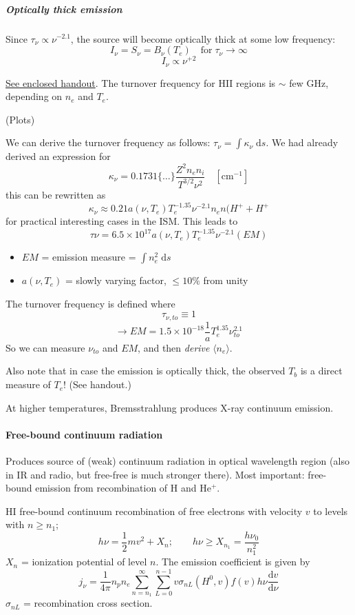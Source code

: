 \documentclass[11pt]{article}
\newcommand{\mar}[1]{\hspace{0pt}\marginpar{-\textcolor{black}{#1}-}}
\begin{document}
\subparagraph{Optically thick emission}
Since $\tau_{\nu} \propto \nu^{-2.1}$, the source will become optically
thick at some low frequency:
\[
    I_{\nu} = S_{\nu} = B_{\nu}(T_{e}) \quad
    \mathrm{for}\; \tau_{\nu} \rightarrow \infty
    \]
\[
    \boxed{ I_{\nu} \propto \nu^{+2} }
    \]

\underline{See enclosed handout}. The turnover frequency for HII regions is
$\sim$ few GHz, depending on $n_{e}$ and $T_{e}$.

\mar{66}(Plots)

\mar{67}We can derive the turnover frequency as follows:
$\tau_{\nu} = \int{\kappa_{\nu}\;\mathrm{d}s}$.
We had already derived an expression for
\[
    \kappa_{\nu} = 0.1731 \{\ldots\} \frac{Z^{2}n_{e}n_{i}}{T^{3/2}\nu^{2}}
    \quad [\mathrm{cm}^{-1}]
    \]
this can be rewritten as
\[
    \kappa_{\nu} \approx 0.21 a(\nu,T_{e}) T_{e}^{-1.35} \nu^{-2.1}
    n_{e}n(H^{+}+H^{+}
    \]
for practical interesting cases in the ISM. This leads to
\[
    \tau{\nu} = 6.5 \times 10^{17} a(\nu,T_{e}) T_{e}^{-1.35} \nu^{-2.1} (EM)
    \]
\begin{itemize}
    \item $EM$ = emission measure = $\int{ n_{e}^{2} \;\mathrm{d}s }$
    \item $a(\nu,T_{e})$ = slowly varying factor, $\leq 10\%$ from unity
\end{itemize}
The turnover frequency is defined where
\[
    \tau_{\nu,to} \equiv 1
    \]
\[
    \rightarrow EM = 1.5 \times 10^{-18} \frac{1}{a} T_{e}^{1.35} \nu_{to}^{2.1}
    \]
So we can measure $\nu_{to}$ and $EM$, and then \emph{derive}
$\langle n_{e} \rangle$.

Also note that in case the emission is optically thick, the observed $T_{b}$
is a direct measure of $T_{e}$! (See handout.)

At higher temperatures, Bremsstrahlung produces X-ray continuum emission.

\paragraph{Free-bound continuum radiation}
\mar{68}Produces source of (weak) continuum radiation in optical wavelength
region (also in IR and radio, but free-free is much stronger there).
Most important: free-bound emission from recombination of H and He$^{+}$.

HI free-bound continuum recombination of free electrons with velocity $v$
to levels with $n \geq n_{1}$;
\[
    h\nu = \frac{1}{2}mv^{2} + X_{n}; \qquad
    h\nu \geq X_{n_{1}} = \frac{h\nu_{0}}{n_{1}^{2}}
    \]
$X_{n}$ = ionization potential of level $n$. The emission coefficient
is given by
\[
    j_{\nu} = \frac{1}{4\pi} n_{p}n_{e} \sum_{n=n_{1}}^{\infty} {
        \sum_{L=0}^{n-1} {
            v \sigma_{nL} (H^{0}, v) f(v) h\nu \frac{\mathrm{d}v}{\mathrm{d}\nu}
        }
    }
    \]
$\sigma_{nL}$ = recombination cross section.
\end{document}
